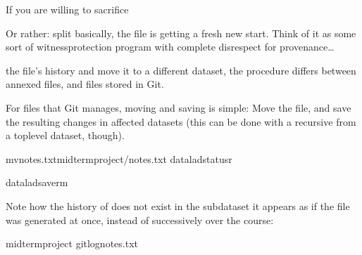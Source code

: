 \sphinxAtStartPar
If you are willing to sacrifice%
\begin{footnote}\sphinxAtStartFootnote
Or rather: split \textendash{} basically, the file is getting a fresh new start.
Think of it as some sort of witness\sphinxhyphen{}protection program with complete
disrespect for provenance…
%
\end{footnote} the file’s history and move it to a
different dataset, the procedure differs between annexed files, and files
stored in Git.

\sphinxAtStartPar
For files that Git manages, moving and saving is simple: Move the file, and
save the resulting changes in  affected datasets (this can be done with
a recursive  from a top\sphinxhyphen{}level dataset, though).

\begin{sphinxVerbatim}[commandchars=\\\{\}]
mvnotes.txtmidterm\PYGZus{}project/notes.txt
dataladstatus\PYGZhy{}r
\end{sphinxVerbatim}

\begin{sphinxVerbatim}[commandchars=\\\{\}]
dataladsave\PYGZhy{}r\PYGZhy{}m
\end{sphinxVerbatim}

\sphinxAtStartPar
Note how the history of  does not exist in the subdataset \textendash{} it appears
as if the file was generated at once, instead of successively over the course:

\begin{sphinxVerbatim}[commandchars=\\\{\}]
midterm\PYGZus{}project
gitlognotes.txt

\end{sphinxVerbatim}


